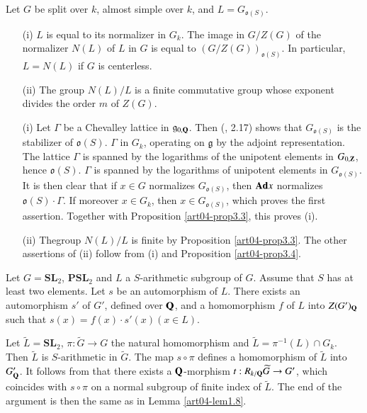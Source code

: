 \begin{lemma}\label{art04-lem4.1}
Let $G$ be split over $k$, almost simple over $k$, and $L=G_{\mathfrak{o}(S)}$.
\begin{itemize}
\item[{\rm(i)}] $L$ is equal to its normalizer in $G_{k}$. The image in $G/Z(G)$ of the normalizer $N(L)$ of $L$ in $G$ is equal to $(G/Z(G))_{\mathfrak{o}(S)}$. In particular, $L=N(L)$ if $G$ is centerless.

\item[{\rm(ii)}] The group $N(L)/L$ is a finite commutative group whose exponent divides the order $m$ of $Z(G)$.
\end{itemize}
\end{lemma}

\begin{itemize}
\item[(i)] Let $\Gamma$ be a Chevalley lattice in $\mathfrak{g}_{0,\mathbf{Q}}$. Then (\cite{art04-key16}, 2.17) shows that $G_{\mathfrak{o}(S)}$ is the stabilizer of $\mathfrak{o}(S)$. $\Gamma$ in $G_{k}$, operating on $\mathfrak{g}$ by the adjoint representation. The lattice $\Gamma$ is spanned by the logarithms of the unipotent elements in $G_{0,\mathbf{Z}}$, hence $\mathfrak{o}(S)$. $\Gamma$ is spanned by the logarithms of unipotent elements in $G_{\mathfrak{o}(S)}$. It is then clear that if $x\in G$ normalizes $G_{\mathfrak{o}(S)}$, then $\mathbf{Ad} x$ normalizes $\mathfrak{o}(S)\cdot \Gamma$. If moreover $x\in G_{k}$, then $x\in G_{\mathfrak{o}(S)}$, which proves the first assertion. Together with Proposition \ref{art04-prop3.3}, this proves (i).

\item[(ii)] The\pageoriginale group $N(L)/L$ is finite by Proposition \ref{art04-prop3.3}. The other assertions of (ii) follow from (i) and Proposition \ref{art04-prop3.4}.
\end{itemize}

\begin{lemma}\label{art04-lem4.2}
Let $G=\mathbf{SL}_{2}$, $\mathbf{PSL}_{2}$ and $L$ a $S$-arithmetic subgroup of $G$. Assume that $S$ has at least two elements. Let $s$ be an automorphism of $L$. There exists an automorphism $s'$ of $G'$, defined over $\mathbf{Q}$, and a homomorphism $f$ of $L$ into $Z(G')_{\mathbf{Q}}$ such that $s(x)=f(x)\cdot s'(x)(x\in L)$.
\end{lemma}

Let $\widetilde{L}=\mathbf{SL}_{2}$, $\pi :\widetilde{G}\to G$ the natural homomorphism and $\widetilde{L}=\pi^{-1}(L)\cap G_{k}$. Then $\widetilde{L}$ is $S$-arithmetic in $\widetilde{G}$. The map $s\circ \pi$ defines a homomorphism of $\widetilde{L}$ into $G'_{\mathbf{Q}}$. It follows from \cite{art04-key29} that there exists a $\mathbf{Q}$-morphism $t:R_{k/\mathbf{Q}}\widetilde{G}\to G'$, which coincides with $s\circ \pi$ on a normal subgroup of finite index of $\widetilde{L}$. The end of the argument is then the same as in Lemma \ref{art04-lem1.8}.

